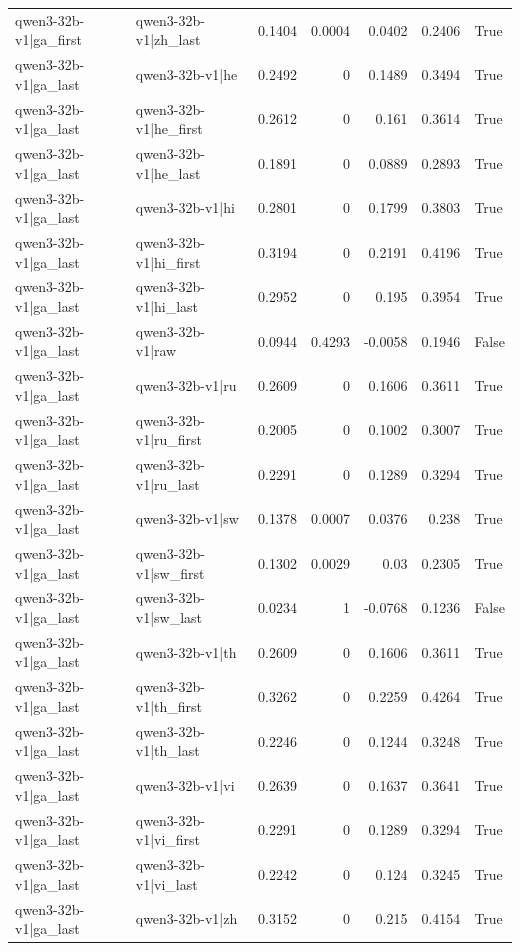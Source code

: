 \begin{table}
\begin{tabular}{l l r r r r l}
qwen3-32b-v1|ga_first & qwen3-32b-v1|zh_last & 0.1404 & 0.0004 & 0.0402 & 0.2406 & True \\
qwen3-32b-v1|ga_last & qwen3-32b-v1|he & 0.2492 & 0 & 0.1489 & 0.3494 & True \\
qwen3-32b-v1|ga_last & qwen3-32b-v1|he_first & 0.2612 & 0 & 0.161 & 0.3614 & True \\
qwen3-32b-v1|ga_last & qwen3-32b-v1|he_last & 0.1891 & 0 & 0.0889 & 0.2893 & True \\
qwen3-32b-v1|ga_last & qwen3-32b-v1|hi & 0.2801 & 0 & 0.1799 & 0.3803 & True \\
qwen3-32b-v1|ga_last & qwen3-32b-v1|hi_first & 0.3194 & 0 & 0.2191 & 0.4196 & True \\
qwen3-32b-v1|ga_last & qwen3-32b-v1|hi_last & 0.2952 & 0 & 0.195 & 0.3954 & True \\
qwen3-32b-v1|ga_last & qwen3-32b-v1|raw & 0.0944 & 0.4293 & -0.0058 & 0.1946 & False \\
qwen3-32b-v1|ga_last & qwen3-32b-v1|ru & 0.2609 & 0 & 0.1606 & 0.3611 & True \\
qwen3-32b-v1|ga_last & qwen3-32b-v1|ru_first & 0.2005 & 0 & 0.1002 & 0.3007 & True \\
qwen3-32b-v1|ga_last & qwen3-32b-v1|ru_last & 0.2291 & 0 & 0.1289 & 0.3294 & True \\
qwen3-32b-v1|ga_last & qwen3-32b-v1|sw & 0.1378 & 0.0007 & 0.0376 & 0.238 & True \\
qwen3-32b-v1|ga_last & qwen3-32b-v1|sw_first & 0.1302 & 0.0029 & 0.03 & 0.2305 & True \\
qwen3-32b-v1|ga_last & qwen3-32b-v1|sw_last & 0.0234 & 1 & -0.0768 & 0.1236 & False \\
qwen3-32b-v1|ga_last & qwen3-32b-v1|th & 0.2609 & 0 & 0.1606 & 0.3611 & True \\
qwen3-32b-v1|ga_last & qwen3-32b-v1|th_first & 0.3262 & 0 & 0.2259 & 0.4264 & True \\
qwen3-32b-v1|ga_last & qwen3-32b-v1|th_last & 0.2246 & 0 & 0.1244 & 0.3248 & True \\
qwen3-32b-v1|ga_last & qwen3-32b-v1|vi & 0.2639 & 0 & 0.1637 & 0.3641 & True \\
qwen3-32b-v1|ga_last & qwen3-32b-v1|vi_first & 0.2291 & 0 & 0.1289 & 0.3294 & True \\
qwen3-32b-v1|ga_last & qwen3-32b-v1|vi_last & 0.2242 & 0 & 0.124 & 0.3245 & True \\
qwen3-32b-v1|ga_last & qwen3-32b-v1|zh & 0.3152 & 0 & 0.215 & 0.4154 & True \\

\end{tabular}
\end{table}
